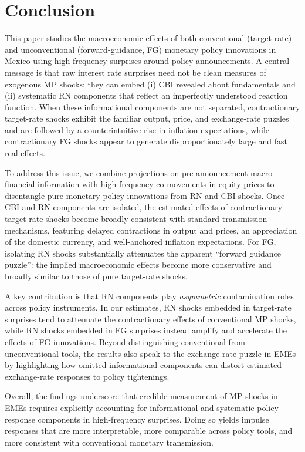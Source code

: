 \documentclass[12pt, reqno]{article}
\begin{document}
\section{Conclusion}
\label{sec:conclusion}

This paper studies the macroeconomic effects of both conventional (target-rate) and unconventional (forward-guidance, FG) monetary policy innovations in Mexico using high-frequency surprises around policy announcements. A central message is that raw interest rate surprises need not be clean measures of exogenous MP shocks: they can embed (i) CBI revealed about fundamentals and (ii) systematic RN components that reflect an imperfectly understood reaction function. When these informational components are not separated, contractionary target-rate shocks exhibit the familiar output, price, and exchange-rate puzzles and are followed by a counterintuitive rise in inflation expectations, while contractionary FG shocks appear to generate disproportionately large and fast real effects.

To address this issue, we combine projections on pre-announcement macro-financial information with high-frequency co-movements in equity prices to disentangle pure monetary policy innovations from RN and CBI shocks. Once CBI and RN components are isolated, the estimated effects of contractionary target-rate shocks become broadly consistent with standard transmission mechanisms, featuring delayed contractions in output and prices, an appreciation of the domestic currency, and well-anchored inflation expectations. For FG, isolating RN shocks substantially attenuates the apparent “forward guidance puzzle”: the implied macroeconomic effects become more conservative and broadly similar to those of pure target-rate shocks.

A key contribution is that RN components play \emph{asymmetric} contamination roles across policy instruments. In our estimates, RN shocks embedded in target-rate surprises tend to attenuate the contractionary effects of conventional MP shocks, while RN shocks embedded in FG surprises instead amplify and accelerate the effects of FG innovations. Beyond distinguishing conventional from unconventional tools, the results also speak to the exchange-rate puzzle in EMEs by highlighting how omitted informational components can distort estimated exchange-rate responses to policy tightenings.

Overall, the findings underscore that credible measurement of MP shocks in EMEs requires explicitly accounting for informational and systematic policy-response components in high-frequency surprises. Doing so yields impulse responses that are more interpretable, more comparable across policy tools, and more consistent with conventional monetary transmission.
\end{document}
